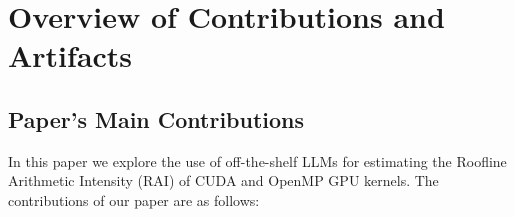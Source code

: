 \documentclass[conference]{IEEEtran}
\begin{document}
\newcommand{\gptoss}{\texttt{GPT-OSS}\xspace}
\newcommand{\opus}{\texttt{Opus-4.6}\xspace}
\newcommand{\gptfivefour}{\texttt{GPT-5.4}\xspace}
\newcommand{\sourceonly}{\textit{source-only}\xspace}
\newcommand{\sourceSASS}{\textit{source+SASS}\xspace}
\newcommand{\pmten}[0]{$\pm10\%$\xspace}
\newcommand{\pmfifty}[0]{$\pm50\%$\xspace}
\newcommand{\bandbound}[0]{BB\xspace}
\newcommand{\compbound}[0]{CB\xspace}
\newcommand{\rai}[0]{RAI\xspace}
\newcommand{\hecbench}[0]{\texttt{HeCBench}\xspace}



\appendixAD

\section{Overview of Contributions and Artifacts}

\subsection{Paper's Main Contributions}


In this paper we explore the use of off-the-shelf LLMs for estimating the Roofline Arithmetic Intensity (RAI) of CUDA and OpenMP GPU kernels.
The contributions of our paper are as follows:
\end{document}
